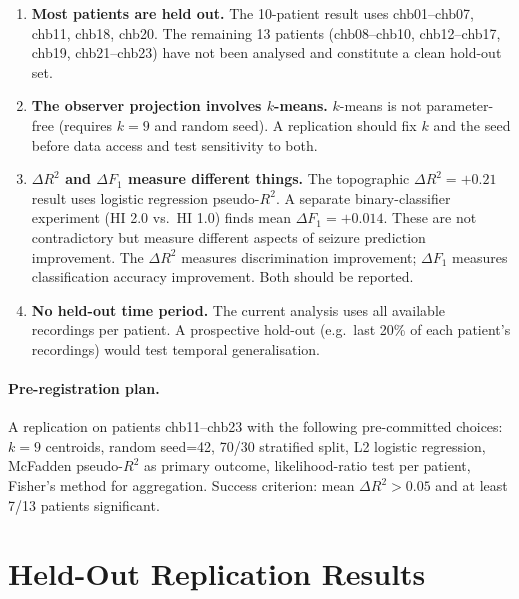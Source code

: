 \documentclass[11pt]{article}
\begin{document}
\begin{enumerate}[label=(\arabic*)]
  \item \textbf{Most patients are held out.}
        The 10-patient result uses chb01--chb07, chb11, chb18, chb20.
        The remaining 13 patients (chb08--chb10, chb12--chb17, chb19, chb21--chb23)
        have not been analysed and constitute a clean hold-out set.

  \item \textbf{The observer projection involves $k$-means.}
        $k$-means is not parameter-free (requires $k=9$ and random seed).
        A replication should fix $k$ and the seed before data access
        and test sensitivity to both.

  \item \textbf{$\Delta R^2$ and $\Delta F_1$ measure different things.}
        The topographic $\Delta R^2 = +0.21$ result uses logistic regression
        pseudo-$R^2$.  A separate binary-classifier experiment (HI 2.0 vs.\ HI 1.0)
        finds mean $\Delta F_1 = +0.014$.  These are not contradictory
        but measure different aspects of seizure prediction improvement.
        The $\Delta R^2$ measures discrimination improvement;
        $\Delta F_1$ measures classification accuracy improvement.
        Both should be reported.

  \item \textbf{No held-out time period.}
        The current analysis uses all available recordings per patient.
        A prospective hold-out (e.g.\ last 20\% of each patient's recordings)
        would test temporal generalisation.
\end{enumerate}

\paragraph{Pre-registration plan.}
A replication on patients chb11--chb23 with the following pre-committed choices:
$k=9$ centroids, random seed=42, 70/30 stratified split, L2 logistic regression,
McFadden pseudo-$R^2$ as primary outcome, likelihood-ratio test per patient,
Fisher's method for aggregation.
Success criterion: mean $\Delta R^2 > 0.05$ and at least 7/13 patients significant.

\section{Held-Out Replication Results}\label{sec:replication}
\end{document}
